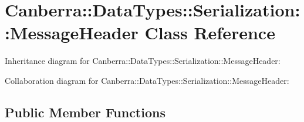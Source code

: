\hypertarget{class_canberra_1_1_data_types_1_1_serialization_1_1_message_header}{}\section{Canberra\+:\+:Data\+Types\+:\+:Serialization\+:\+:Message\+Header Class Reference}
\label{class_canberra_1_1_data_types_1_1_serialization_1_1_message_header}


Inheritance diagram for Canberra\+:\+:Data\+Types\+:\+:Serialization\+:\+:Message\+Header\+:


Collaboration diagram for Canberra\+:\+:Data\+Types\+:\+:Serialization\+:\+:Message\+Header\+:
\subsection*{Public Member Functions}
